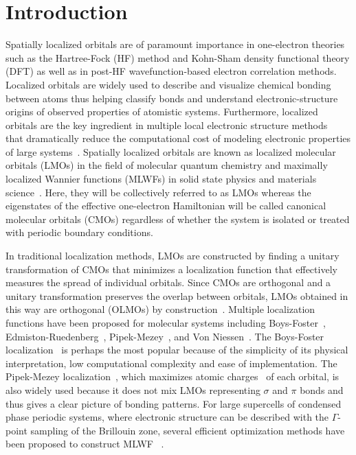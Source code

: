 \documentclass[aps,prl,reprint,amsmath,amssymb]{revtex4-1}
\begin{document}
\section{Introduction} 

Spatially localized orbitals are of paramount importance in one-electron theories such as the Hartree-Fock (HF) method and Kohn-Sham density functional theory (DFT) as well as in post-HF wavefunction-based electron correlation methods.
Localized orbitals are widely used to describe and visualize chemical bonding between atoms thus helping classify bonds and understand electronic-structure origins of observed properties of atomistic systems. 
Furthermore, localized orbitals are the key ingredient in multiple local electronic structure methods~\cite{goedecker1994efficient, bowler2012methods, zalesny2011linear, pulay1986orbital, saebo2001low, pisani2005local, hampel1996local, forner1997numerical} that dramatically reduce the computational cost of modeling electronic properties of large systems~\cite{saebo1993local, schutz1999low, hetzer2000low, schutz2001low}.
Spatially localized orbitals are known as localized molecular orbitals (LMOs) in the field of molecular quantum chemistry and maximally localized Wannier functions (MLWFs) in solid state physics and materials science~\cite{marzari2012maximally}. 
Here, they will be collectively referred to as LMOs whereas the eigenstates of the effective one-electron Hamiltonian will be called canonical molecular orbitals (CMOs) regardless of whether the system is isolated or treated with periodic boundary conditions.

In traditional localization methods, LMOs are constructed by finding a unitary transformation of CMOs that minimizes a localization function that effectively measures the spread of individual orbitals. 
Since CMOs are orthogonal and a unitary transformation preserves the overlap between orbitals, LMOs obtained in this way are orthogonal (OLMOs) by construction~\cite{weinstein1971localized}.
Multiple localization functions have been proposed for molecular systems including Boys-Foster~\cite{boys1960construction}, Edmiston-Ruedenberg~\cite{bytautas2002electron, bytautas2003split, edmiston1963localized}, Pipek-Mezey~\cite{pipek1989a_fast}, and Von Niessen~\cite{niessen1972density}. The Boys-Foster localization~\cite{boys1960construction} is perhaps the most popular because of the simplicity of its physical interpretation, low computational complexity and ease of implementation. 
The Pipek-Mezey localization~\cite{pipek1989a_fast}, which maximizes atomic charges~\cite{mulliken1955electronic, lowdin1950non} of each orbital, is also widely used because it does not mix LMOs representing $\sigma$ and $\pi$ bonds and thus gives a clear picture of bonding patterns. 
For large supercells of condensed phase periodic systems, where electronic structure can be described with the $\Gamma$-point sampling of the Brillouin zone, several efficient optimization methods have been proposed to construct MLWF ~\cite{marzari2012maximally, resta1998quantum, resta1999electron, silvestrelli1999maximally, berghold2000general}. 
\end{document}
